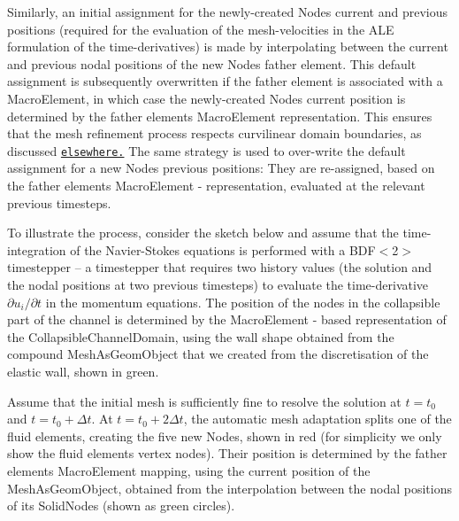 Similarly, an initial assignment for the newly-\/created {\ttfamily Node\textquotesingle{}s} current and previous positions (required for the evaluation of the mesh-\/velocities in the A\+LE formulation of the time-\/derivatives) is made by interpolating between the current and previous nodal positions of the new {\ttfamily Node\textquotesingle{}s} father element. This default assignment is subsequently overwritten if the father element is associated with a {\ttfamily Macro\+Element}, in which case the newly-\/created {\ttfamily Node\textquotesingle{}s} current position is determined by the father element\textquotesingle{}s {\ttfamily Macro\+Element} representation. This ensures that the mesh refinement process respects curvilinear domain boundaries, as discussed \href{../../../poisson/fish_poisson2/html/index.html}{\tt elsewhere.} The same strategy is used to over-\/write the default assignment for a new {\ttfamily Node\textquotesingle{}s} previous positions\+: They are re-\/assigned, based on the father element\textquotesingle{}s {\ttfamily Macro\+Element} -\/ representation, evaluated at the relevant previous timesteps.

To illustrate the process, consider the sketch below and assume that the time-\/integration of the Navier-\/\+Stokes equations is performed with a {\ttfamily B\+D\+F$<$2$>$} timestepper -- a timestepper that requires two history values (the solution and the nodal positions at two previous timesteps) to evaluate the time-\/derivative $ \partial u_i/\partial t $ in the momentum equations. The position of the nodes in the collapsible part of the channel is determined by the {\ttfamily Macro\+Element} -\/ based representation of the {\ttfamily Collapsible\+Channel\+Domain}, using the wall shape obtained from the compound {\ttfamily Mesh\+As\+Geom\+Object} that we created from the discretisation of the elastic wall, shown in green.

Assume that the initial mesh is sufficiently fine to resolve the solution at $ t=t_0 $ and $ t=t_0 + \Delta t $. At $ t=t_0 + 2 \Delta t $, the automatic mesh adaptation splits one of the fluid elements, creating the five new {\ttfamily Nodes}, shown in red (for simplicity we only show the fluid elements\textquotesingle{} vertex nodes). Their position is determined by the father element\textquotesingle{}s {\ttfamily Macro\+Element} mapping, using the current position of the {\ttfamily Mesh\+As\+Geom\+Object}, obtained from the interpolation between the nodal positions of its {\ttfamily Solid\+Nodes} (shown as green circles).

